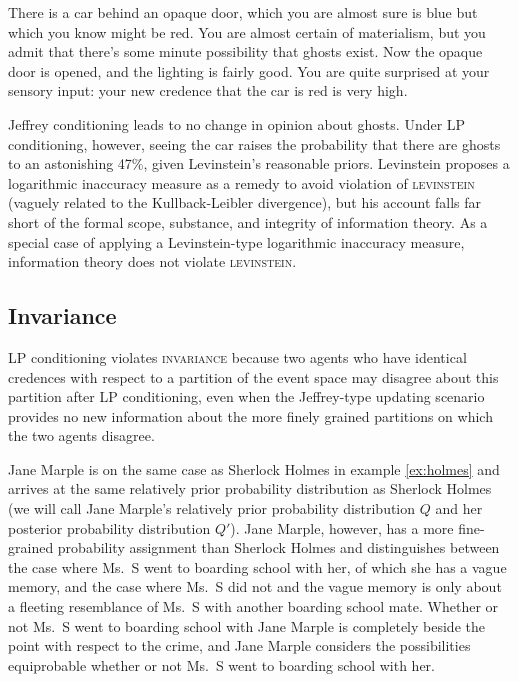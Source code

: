 \documentclass[11pt]{article}
\begin{document}
\begin{quotex}
  \label{ex:levinstein} There is a car
  behind an opaque door, which you are almost sure is blue but which
  you know might be red. You are almost certain of materialism, but
  you admit that there's some minute possibility that ghosts exist.
  Now the opaque door is opened, and the lighting is fairly good. You
  are quite surprised at your sensory input: your new credence that
  the car is red is very high.
\end{quotex}

Jeffrey conditioning leads to no change in opinion about ghosts. Under
LP conditioning, however, seeing the car raises the probability that
there are ghosts to an astonishing 47\%, given Levinstein's reasonable
priors. Levinstein proposes a logarithmic inaccuracy measure as a
remedy to avoid violation of \textsc{levinstein} (vaguely related to
the Kullback-Leibler divergence), but his account falls far short of
the formal scope, substance, and integrity of information theory.
As a special case of applying a Levinstein-type logarithmic inaccuracy
measure, information theory does not violate \textsc{levinstein}.

\subsection{Invariance}
\label{Invariance}

LP conditioning violates \textsc{invariance} because two agents who
have identical credences with respect to a partition of the event
space may disagree about this partition after LP conditioning, even
when the Jeffrey-type updating scenario provides no new information
about the more finely grained partitions on which the two agents
disagree. 

\begin{quotex}
  \label{ex:marple} Jane Marple is on the same
  case as Sherlock Holmes in example \ref{ex:holmes} and arrives at
  the same relatively prior probability distribution as Sherlock
  Holmes (we will call Jane Marple's relatively prior probability
  distribution $Q$ and her posterior probability distribution $Q'$).
  Jane Marple, however, has a more fine-grained probability assignment
  than Sherlock Holmes and distinguishes between the case where Ms.\ S
  went to boarding school with her, of which she has a vague memory,
  and the case where Ms.\ S did not and the vague memory is only about
  a fleeting resemblance of Ms.\ S with another boarding school mate.
  Whether or not Ms.\ S went to boarding school with Jane Marple is
  completely beside the point with respect to the crime, and Jane
  Marple considers the possibilities equiprobable whether or not Ms.\
  S went to boarding school with her.
\end{quotex}
\end{document}
